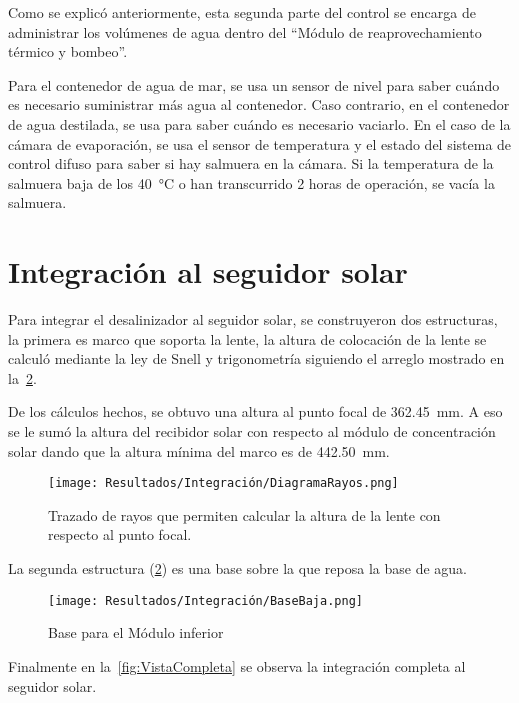 			Como se explicó anteriormente, esta segunda parte del control se encarga de administrar los volúmenes de agua dentro del ``Módulo de reaprovechamiento térmico y bombeo''.
			
			Para el contenedor de agua de mar, se usa un sensor de nivel para saber cuándo es necesario suministrar más agua al contenedor. Caso contrario, en el contenedor de agua destilada, se usa para saber cuándo es necesario vaciarlo. En el caso de la cámara de evaporación, se usa el sensor de temperatura y el estado del sistema de control difuso para saber si hay salmuera en la cámara. Si la temperatura de la salmuera baja de los \qty{40}{\degreeCelsius} o han transcurrido 2 horas de operación, se vacía la salmuera.

	
	\section{Integración al seguidor solar}
		
		Para integrar el desalinizador al seguidor solar, se construyeron dos estructuras, la primera es marco que soporta la lente, la altura de colocación de la lente se calculó mediante la ley de Snell y trigonometría siguiendo el arreglo mostrado en la~\cref{fig:DiagramaRayos}.
		
		De los cálculos hechos, se obtuvo una altura al punto focal de \qty{362.45}{\mm}. A eso se le sumó la altura del recibidor solar con respecto al módulo de concentración solar dando que la altura mínima del marco es de \qty{442.50}{\mm}.
		
		\begin{figure}[H]
			\centering
			\texttt{[image: Resultados/Integración/DiagramaRayos.png]}
			\caption{Trazado de rayos que permiten calcular la altura de la lente con respecto al punto focal.}
			\label{fig:DiagramaRayos}
		\end{figure}
		
		La segunda estructura (\cref{fig:DiagramaRayos}) es una base sobre la que reposa la base de agua.
		
		\begin{figure}[H]
			\centering
			\texttt{[image: Resultados/Integración/BaseBaja.png]}
			\caption{Base para el Módulo inferior}
			\label{fig:DiagramaRayos}
		\end{figure}
		
		Finalmente en la~\cref{fig:VistaCompleta} se observa la integración completa al seguidor solar.
		
